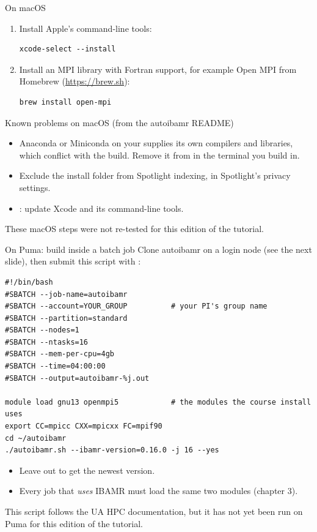 \documentclass[aspectratio=169,11pt]{beamer}
\begin{document}
\begin{frame}[fragile]{On macOS}
\begin{enumerate}
  \item Install Apple's command-line tools:
\begin{lstlisting}[style=shell]
xcode-select --install
\end{lstlisting}
  \item Install an MPI library with Fortran support, for example Open MPI from Homebrew (\url{https://brew.sh}):
\begin{lstlisting}[style=shell]
brew install open-mpi
\end{lstlisting}
\end{enumerate}
\begin{alertblock}{Known problems on macOS (from the autoibamr README)}
\begin{itemize}\small
  \item Anaconda or Miniconda on your  supplies its own compilers and libraries, which conflict with the build. Remove it from  in the terminal you build in.
  \item Exclude the install folder from Spotlight indexing, in Spotlight's privacy settings.
  \item {}: update Xcode and its command-line tools.
\end{itemize}
\end{alertblock}
\small These macOS steps were not re-tested for this edition of the tutorial.
\end{frame}

\begin{frame}[fragile]{On Puma: build inside a batch job}
Clone autoibamr on a login node (see the next slide), then submit this script with :
\begin{lstlisting}[style=slurm]
#!/bin/bash
#SBATCH --job-name=autoibamr
#SBATCH --account=YOUR_GROUP          # your PI's group name
#SBATCH --partition=standard
#SBATCH --nodes=1
#SBATCH --ntasks=16
#SBATCH --mem-per-cpu=4gb
#SBATCH --time=04:00:00
#SBATCH --output=autoibamr-%j.out

module load gnu13 openmpi5            # the modules the course install uses
export CC=mpicc CXX=mpicxx FC=mpif90
cd ~/autoibamr
./autoibamr.sh --ibamr-version=0.16.0 -j 16 --yes
\end{lstlisting}
\begin{itemize}\small
  \item Leave out  to get the newest version.
  \item Every job that \emph{uses} IBAMR must load the same two modules (chapter 3).
\end{itemize}
\small This script follows the UA HPC documentation, but it has not yet been run on Puma for this edition of the tutorial.
\end{frame}
\end{document}
